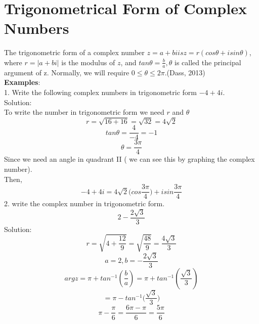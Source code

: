 \documentclass[a4paper, 12pt]{report}
\begin{document}
{\section{Trigonometrical Form of Complex Numbers}
The trigonometric form of a complex number $z = a + bi is z = r(cos\theta + isin\theta)$, where $r = |a + bi|$ is the modulus of $z$, and $tan\theta = \frac{b}{a}, \theta$ is called the principal argument of z. Normally, we will require $0 \leq \theta \leq 2\pi$.(Dass, 2013)\\
\textbf{Examples}:\\
1. Write the following complex numbers in trigonometric form $- 4 + 4i$.\\
Solution:\\
To write the number in trigonometric form we need $r$ and $\theta$
\begin{equation*}
r = \sqrt{16 + 16} = \sqrt{32} = 4\sqrt{2}
\end{equation*}
\begin{equation*}
tan\theta = \frac{4}{-4} = -1
\end{equation*}
\begin{equation*}
\theta = \frac{3\pi}{4}
\end{equation*}
Since we need an angle in quadrant II ( we can see this by graphing the complex number).\\
Then,
\begin{equation*}
-4 + 4i = 4\sqrt{2}\bigg(cos\frac{3\pi}{4}\bigg) + isin\frac{3\pi}{4}
\end{equation*}
2. write the complex number in trigonometric form.
\begin{equation*}
2 - \frac{2\sqrt{3}}{3}
\end{equation*}
Solution:
\begin{equation*}
r = \sqrt{4 + \frac{12}{9}} = \sqrt{\frac{48}{9}} = \frac{4\sqrt{3}}{3}
\end{equation*}
\begin{equation*}
a = 2, b = -\frac{2\sqrt{3}}{3}
\end{equation*}
\begin{equation*}
argz = \pi + tan^{-1}(\frac{b}{a}) = \pi + tan^{-1}(\frac{\sqrt{3}}{3})
\end{equation*}
\begin{equation*}
= \pi - tan^{-1}\bigg(\frac{\sqrt{3}}{3}\bigg)
\end{equation*}
\begin{equation*}
\pi - \frac{\pi}{6} = \frac{6\pi - \pi}{6} = \frac{5\pi}{6}
\end{equation*}
}
\end{document}
